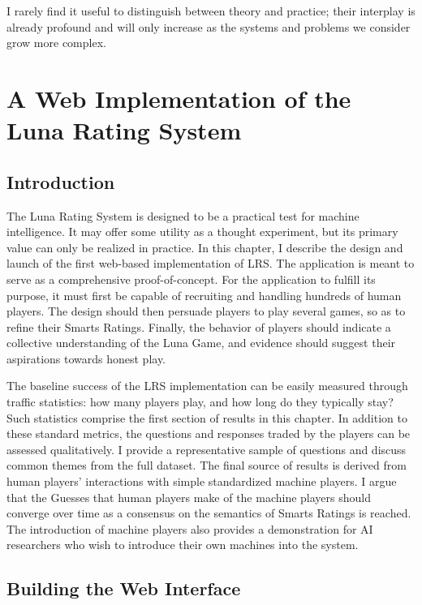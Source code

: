 \begin{savequote}[75mm]
I rarely find it useful to distinguish between theory and practice; their interplay is already profound and will only increase as the systems and problems we consider grow more complex.
\end{savequote}

\chapter{A Web Implementation of the Luna Rating System}

\section{Introduction}

The Luna Rating System is designed to be a practical test for machine intelligence. It may offer some utility as a thought experiment, but its primary value can only be realized in practice. In this chapter, I describe the design and launch of the first web-based implementation of LRS. The application is meant to serve as a comprehensive proof-of-concept. For the application to fulfill its purpose, it must first be capable of recruiting and handling hundreds of human players. The design should then persuade players to play several games, so as to refine their Smarts Ratings. Finally, the behavior of players should indicate a collective understanding of the Luna Game, and evidence should suggest their aspirations towards honest play.

The baseline success of the LRS implementation can be easily measured through traffic statistics: how many players play, and how long do they typically stay? Such statistics comprise the first section of results in this chapter. In addition to these standard metrics, the questions and responses traded by the players can be assessed qualitatively. I provide a representative sample of questions and discuss common themes from the full dataset. The final source of results is derived from human players' interactions with simple standardized machine players. I argue that the Guesses that human players make of the machine players should converge over time as a consensus on the semantics of Smarts Ratings is reached. The introduction of machine players also provides a demonstration for AI researchers who wish to introduce their own machines into the system.

\section{Building the Web Interface}


